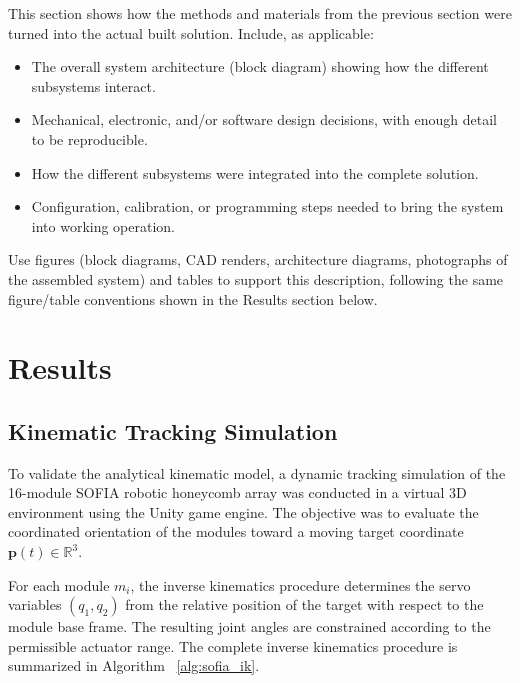 \documentclass[lettersize,journal]{IEEEtran}
\begin{document}
This section shows how the methods and materials from the
previous section were turned into the actual built solution. Include,
as applicable:
\begin{itemize}
\item The overall system architecture (block diagram) showing how
the different subsystems interact.
\item Mechanical, electronic, and/or software design decisions, with
enough detail to be reproducible.
\item How the different subsystems were integrated into the complete
solution.
\item Configuration, calibration, or programming steps needed to
bring the system into working operation.
\end{itemize}
Use figures (block diagrams, CAD renders, architecture diagrams,
photographs of the assembled system) and tables to support this
description, following the same figure/table conventions shown in the
Results section below.

\section{Results}
\label{sec:results}

\subsection{Kinematic Tracking Simulation}
\label{sec:results_simulation}

To validate the analytical kinematic model, a dynamic tracking
simulation of the 16-module SOFIA robotic honeycomb array was
conducted in a virtual 3D environment using the Unity game engine. The objective was to evaluate
the coordinated orientation of the modules toward a moving target
coordinate $\mathbf{p}(t) \in \mathbb{R}^3$.

For each module $m_i$, the inverse kinematics procedure determines
the servo variables $(q_1,q_2)$ from the relative position of the
target with respect to the module base frame. The resulting joint
angles are constrained according to the permissible actuator range.
The complete inverse kinematics procedure is summarized in
Algorithm ~\ref{alg:sofia_ik}.
\end{document}
